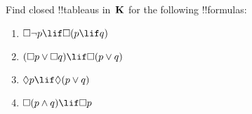 \documentclass[../../../include/open-logic-section]{subfiles}
\begin{document}
\begin{prob}
  Find closed !!{tableau}s in~$\Log{K}$ for the following !!{formula}s:
  \begin{enumerate}
    \item $\Box \lnot p \lif \Box(p \lif q)$
    \item $(\Box p \lor \Box q) \lif \Box(p \lor q)$
    \item $\Diamond p \lif \Diamond(p \lor q)$
    \item $\Box(p \land q) \lif \Box p$
  \end{enumerate}
\end{prob}
\end{document}

